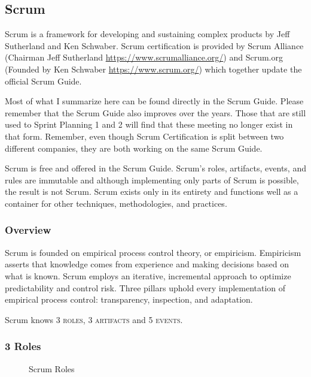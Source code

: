 \subsection{Scrum}
Scrum is a framework for developing and sustaining complex products by Jeff Sutherland and Ken Schwaber. Scrum certification is provided by Scrum Alliance (Chairman Jeff Sutherland \url{https://www.scrumalliance.org/}) and Scrum.org (Founded by Ken Schwaber \url{https://www.scrum.org/}) which together update the official Scrum Guide\cite{scrum:guide}.\newline

Most of what I summarize here can be found directly in the Scrum Guide. Please remember that the Scrum Guide also improves over the years. Those that are still used to Sprint Planning 1 and 2 will find that these meeting no longer exist in that form. Remember, even though Scrum Certification is split between two different companies, they are both working on the same Scrum Guide.\newline

Scrum is free and offered in the Scrum Guide\cite{scrum:guide}. Scrum’s roles, artifacts, events, and rules are immutable and although implementing only parts of Scrum is possible, the result is not Scrum. Scrum exists only in its entirety and functions well as a container for other techniques, methodologies, and practices.

\subsubsection{Overview}

Scrum is founded on empirical process control theory, or empiricism. Empiricism asserts that knowledge comes from experience and making decisions based on what is known. Scrum employs an iterative, incremental approach to optimize predictability and control risk. Three pillars uphold every implementation of empirical process control: transparency, inspection, and adaptation.

Scrum knows \textsc{3 roles}, \textsc{3 artifacts} and \textsc{5 events}.\newline


\subsubsection{3 Roles}
\begin{figure}[H] %
\caption{Scrum Roles}
\label{fig:scrum:roles}
\end{figure}

